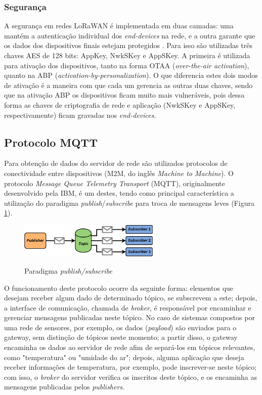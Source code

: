 \documentclass[oneside,openright,12pt]{ufsm_2015} %
\begin{document}
\subsubsection{Segurança}
A segurança em redes LoRaWAN é implementada em duas camadas: uma mantém a autenticação individual dos \textit{end-devices} na rede, e a outra garante que os dados dos dispositivos finais estejam protegidos \cite{lora-overview}. Para isso são utilizadas três chaves AES de 128 bits:  AppKey, NwkSKey e AppSKey. A primeira é utilizada para ativação dos dispositivos, tanto na forma OTAA (\textit{over-the-air activation}), quanto na ABP (\textit{activation-by-personalization}). O que diferencia estes dois modos de ativação é a maneira com que cada um gerencia as outras duas chaves, sendo que na ativação ABP os dispositivos ficam muito mais vulneráveis, pois dessa forma as chaves de criptografia de rede e aplicação (NwkSKey e AppSKey, respectivamente) ficam gravadas nos \textit{end-devices}.



\subsection{Protocolo MQTT}
Para obtenção de dados do servidor de rede são utilizados protocolos de conectividade entre dispositivos (M2M, do inglês \textit{Machine to Machine}). O protocolo \textit{Message Queue Telemetry Transport} (MQTT), originalmente desenvolvido pela IBM, é um destes, tendo como principal característica a utilização do paradigma \textit{publish}/\textit{subscribe} para troca de mensagens leves (Figura \ref{fig:mqtt-topico}).
\begin{figure}[H]
    \caption{\label{exepretex} Paradigma \textit{publish/subscribe}}
    \centering
    \includegraphics[width=0.6\textwidth]{figuras/publish-subscribe.png}
    \vspace{\baselineskip} %
        \label{fig:mqtt-topico}
\end{figure}

O funcionamento deste protocolo ocorre da seguinte forma: elementos que desejam receber algum dado de determinado tópico, se subscrevem a este; depois, a interface de comunicação, chamada de \textit{broker}, é responsável por encaminhar e gerenciar mensagens publicadas neste tópico. No caso de sistemas compostos por uma rede de sensores, por exemplo, os dados (\textit{payload}) são enviados para o gateway, sem distinção de tópicos neste momento; a partir disso, o gateway encaminha os dados ao servidor de rede afim de separá-los em tópicos relevantes, como "temperatura" ou "umidade do ar"; depois, alguma aplicação que deseja receber informações de temperatura, por exemplo, pode inscrever-se neste tópico; com isso, o \textit{broker} do servidor verifica os inscritos deste tópico, e os encaminha as mensagens publicadas pelos \textit{publishers}. 
\end{document}
